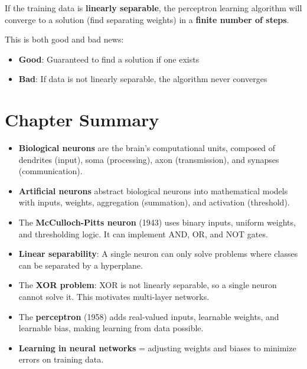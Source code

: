 \begin{theorembox}
If the training data is \textbf{linearly separable}, the perceptron learning algorithm will converge to a solution (find separating weights) in a \textbf{finite number of steps}.
\end{theorembox}

This is both good and bad news:
\begin{itemize}
    \item \textbf{Good}: Guaranteed to find a solution if one exists
    \item \textbf{Bad}: If data is not linearly separable, the algorithm never converges
\end{itemize}


\section{Chapter Summary}

\begin{itemize}
    \item \textbf{Biological neurons} are the brain's computational units, composed of dendrites (input), soma (processing), axon (transmission), and synapses (communication).
    
    \item \textbf{Artificial neurons} abstract biological neurons into mathematical models with inputs, weights, aggregation (summation), and activation (threshold).
    
    \item The \textbf{McCulloch-Pitts neuron} (1943) uses binary inputs, uniform weights, and thresholding logic. It can implement AND, OR, and NOT gates.
    
    \item \textbf{Linear separability}: A single neuron can only solve problems where classes can be separated by a hyperplane.
    
    \item The \textbf{XOR problem}: XOR is not linearly separable, so a single neuron cannot solve it. This motivates multi-layer networks.
    
    \item The \textbf{perceptron} (1958) adds real-valued inputs, learnable weights, and learnable bias, making learning from data possible.
    
    \item \textbf{Learning in neural networks} = adjusting weights and biases to minimize errors on training data.
\end{itemize}

